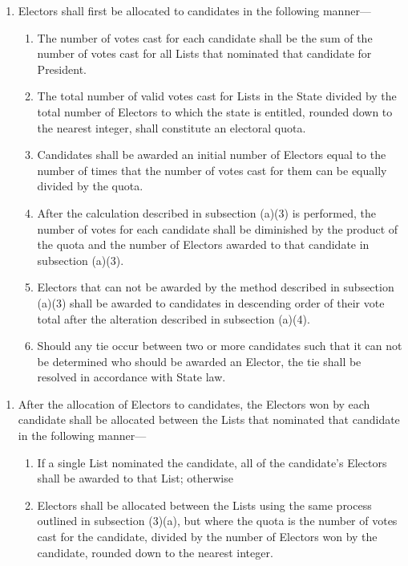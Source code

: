 \documentclass{article}
\begin{document}
    \begin{enumerate}
        \item Electors shall first be allocated to candidates in the following manner---
        \begin{enumerate}
            \item The number of votes cast for each candidate shall be the sum of the number of votes cast for all Lists that nominated that candidate for President.
            \item The total number of valid votes cast for Lists in the State divided by the total number of Electors to which the state is entitled, rounded down to the nearest integer, shall constitute an electoral quota.
            \item Candidates shall be awarded an initial number of Electors equal to the number of times that the number of votes cast for them can be equally divided by the quota.
            \item After the calculation described in subsection (a)(3) is performed, the number of votes for each candidate shall be diminished by the product of the quota and the number of Electors awarded to that candidate in subsection (a)(3).
            \item Electors that can not be awarded by the method described in subsection (a)(3) shall be awarded to candidates in descending order of their vote total after the alteration described in subsection (a)(4).
            \item Should any tie occur between two or more candidates such that it can not be determined who should be awarded an Elector, the tie shall be resolved in accordance with State law.
        \end{enumerate}
    \end{enumerate}
    \begin{enumerate}
        \item After the allocation of Electors to candidates, the Electors won by each candidate shall be allocated between the Lists that nominated that candidate in the following manner---
        \begin{enumerate}
            \item If a single List nominated the candidate, all of the candidate's Electors shall be awarded to that List; otherwise
            \item Electors shall be allocated between the Lists using the same process outlined in subsection (3)(a), but where the quota is the number of votes cast for the candidate, divided by the number of Electors won by the candidate, rounded down to the nearest integer.
        \end{enumerate}
    \end{enumerate}
\end{document}
